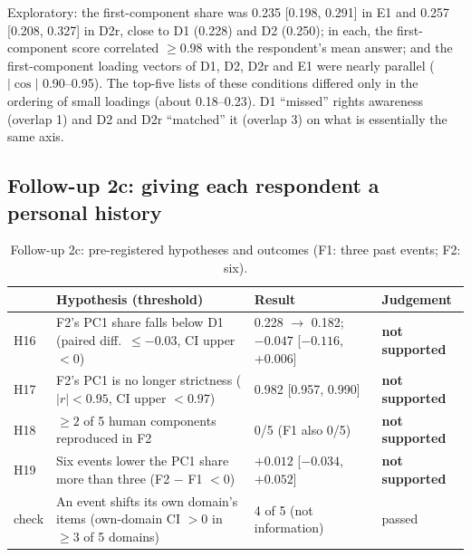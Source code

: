 \documentclass[11pt]{article}
\begin{document}
Exploratory: the first-component share was 0.235 [0.198, 0.291] in E1 and 0.257 [0.208, 0.327] in D2r, close to D1 (0.228) and D2 (0.250); in each, the first-component score correlated $\ge 0.98$ with the respondent's mean answer; and the first-component loading vectors of D1, D2, D2r and E1 were nearly parallel ($|\cos|$ 0.90--0.95). The top-five lists of these conditions differed only in the ordering of small loadings (about 0.18--0.23). D1 ``missed'' rights awareness (overlap 1) and D2 and D2r ``matched'' it (overlap 3) on what is essentially the same axis.

\subsection{Follow-up 2c: giving each respondent a personal history}

\begin{table}[!htbp]
\centering\small
\caption{Follow-up 2c: pre-registered hypotheses and outcomes (F1: three past events; F2: six).}
\label{tab:hyp2c}
\begin{tabularx}{\textwidth}{@{}lLLl@{}}
\toprule
 & Hypothesis (threshold) & Result & Judgement \\
\midrule
H16 & F2's PC1 share falls below D1 (paired diff.\ $\le -0.03$, CI upper $<0$) & 0.228 $\to$ 0.182; $-0.047$ [$-0.116$, $+0.006$] & \textbf{not supported} \\
H17 & F2's PC1 is no longer strictness ($|r| < 0.95$, CI upper $<0.97$) & 0.982 [0.957, 0.990] & \textbf{not supported} \\
H18 & $\ge 2$ of 5 human components reproduced in F2 & 0/5 (F1 also 0/5) & \textbf{not supported} \\
H19 & Six events lower the PC1 share more than three (F2 $-$ F1 $<0$) & $+0.012$ [$-0.034$, $+0.052$] & \textbf{not supported} \\
check & An event shifts its own domain's items (own-domain CI $>0$ in $\ge 3$ of 5 domains) & 4 of 5 (not information) & passed \\
\bottomrule
\end{tabularx}
\end{table}
\end{document}
